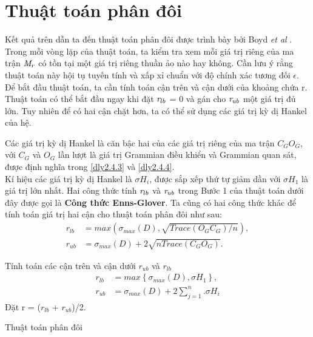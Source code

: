 \section{Thuật toán phân đôi}
Kết quả trên dẫn ta đến thuật toán phân đôi được trình bày bởi Boyd \emph{et al} \cite{3}. Trong mỗi vòng lặp của thuật toán, ta kiểm tra  xem mỗi giá trị riêng của ma trận $\emph{M}_r$ có tồn tại một giá trị riêng thuần ảo nào hay không. Cần lưu ý rằng thuật toán này hội tụ tuyến tính và xấp xỉ chuẩn \hinf với độ chính xác tương đối $ \epsilon$. Để bắt đầu thuật toán, ta cần tính toán cận trên và cận dưới của khoảng chứa r. Thuật toán có thể bắt đầu ngay khi đặt $\emph{r}_{lb}$ = 0 và gán cho $\emph{r}_{ub}$ một giá trị đủ lớn. Tuy nhiên để có hai cận chặt hơn, ta có thể sử dụng các giá trị kỳ dị Hankel của hệ.
\begin{definition}
Các giá trị kỳ dị Hankel là căn bậc hai của các giá trị riêng của ma trận $C_{G}O_G$, với $C_G$ và $O_G$ lần lượt là giá trị Grammian điều khiển và Grammian quan sát, được định nghĩa trong \eqref{dly2.4.3} và \eqref{dly2.4.4}.\\
Kí hiệu các giá trị kỳ dị Hankel là $\sigma H_i$, được sắp xếp thứ tự giảm dần với $\sigma H_1$ là giá trị lớn nhất.
\newline
\newline
Hai công thức tính $\emph{r}_{lb}$ và $\emph{r}_{ub}$ trong Bước 1 của thuật toán dưới đây được gọi là \textbf{Công thức Enns-Glover}. Ta cũng có hai công thức khác để tính toán giá trị hai cận cho thuật toán phân đôi như sau:
\begin{align}\label{ct3.2.1}
    r_{lb} &= max({\sigma_{max}(D), \sqrt{Trace(O_{G}C_{G})/n}}),\\
    r_{ub} &= \sigma_{max}(D) + 2\sqrt{nTrace(C_{G}O_{G})}.\nonumber
\end{align}
\end{definition}
\begin{algorithm}[H]
\SetAlgoLined
{}
 Tính toán các cận trên và cận dưới $r_{ub}$ và $r_{lb}$
    \begin{align}
        r_{lb} &= max\left\{\sigma_{max}(D), \sigma H_1\right\}, \\
        r_{ub} &= \sigma_{max}(D) + 2\sum_{j = 1}^{n}. \sigma H_i\nonumber
    \end{align}
    Đặt r  = ($r_{lb}$ + $r_{ub}$)/2.
    \newline
 \caption{Thuật toán phân đôi}
\end{algorithm}
